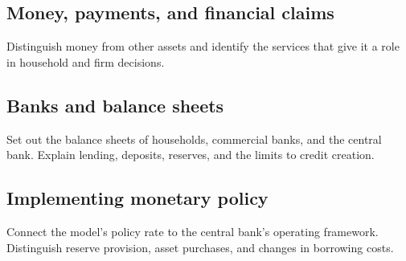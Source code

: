 \label{sec:money-banking}

\subsection{Money, payments, and financial claims}
Distinguish money from other assets and identify the services that give it a
role in household and firm decisions.

\subsection{Banks and balance sheets}
Set out the balance sheets of households, commercial banks, and the central
bank. Explain lending, deposits, reserves, and the limits to credit creation.

\subsection{Implementing monetary policy}
Connect the model's policy rate to the central bank's operating framework.
Distinguish reserve provision, asset purchases, and changes in borrowing costs.
